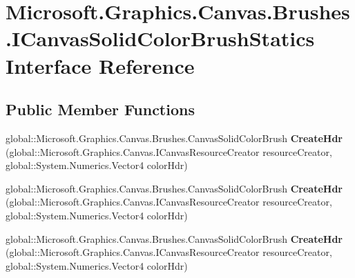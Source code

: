 \hypertarget{interface_microsoft_1_1_graphics_1_1_canvas_1_1_brushes_1_1_i_canvas_solid_color_brush_statics}{}\section{Microsoft.\+Graphics.\+Canvas.\+Brushes.\+I\+Canvas\+Solid\+Color\+Brush\+Statics Interface Reference}
\label{interface_microsoft_1_1_graphics_1_1_canvas_1_1_brushes_1_1_i_canvas_solid_color_brush_statics}
\subsection*{Public Member Functions}
\begin{DoxyCompactItemize}
\item 
\mbox{\label{interface_microsoft_1_1_graphics_1_1_canvas_1_1_brushes_1_1_i_canvas_solid_color_brush_statics_a51d5d5880725d4fdbdadacea96f02cb0}} 
global\+::\+Microsoft.\+Graphics.\+Canvas.\+Brushes.\+Canvas\+Solid\+Color\+Brush {\bfseries Create\+Hdr} (global\+::\+Microsoft.\+Graphics.\+Canvas.\+I\+Canvas\+Resource\+Creator resource\+Creator, global\+::\+System.\+Numerics.\+Vector4 color\+Hdr)
\item 
\mbox{\label{interface_microsoft_1_1_graphics_1_1_canvas_1_1_brushes_1_1_i_canvas_solid_color_brush_statics_a51d5d5880725d4fdbdadacea96f02cb0}} 
global\+::\+Microsoft.\+Graphics.\+Canvas.\+Brushes.\+Canvas\+Solid\+Color\+Brush {\bfseries Create\+Hdr} (global\+::\+Microsoft.\+Graphics.\+Canvas.\+I\+Canvas\+Resource\+Creator resource\+Creator, global\+::\+System.\+Numerics.\+Vector4 color\+Hdr)
\item 
\mbox{\label{interface_microsoft_1_1_graphics_1_1_canvas_1_1_brushes_1_1_i_canvas_solid_color_brush_statics_a51d5d5880725d4fdbdadacea96f02cb0}} 
global\+::\+Microsoft.\+Graphics.\+Canvas.\+Brushes.\+Canvas\+Solid\+Color\+Brush {\bfseries Create\+Hdr} (global\+::\+Microsoft.\+Graphics.\+Canvas.\+I\+Canvas\+Resource\+Creator resource\+Creator, global\+::\+System.\+Numerics.\+Vector4 color\+Hdr)

\end{DoxyCompactItemize}
